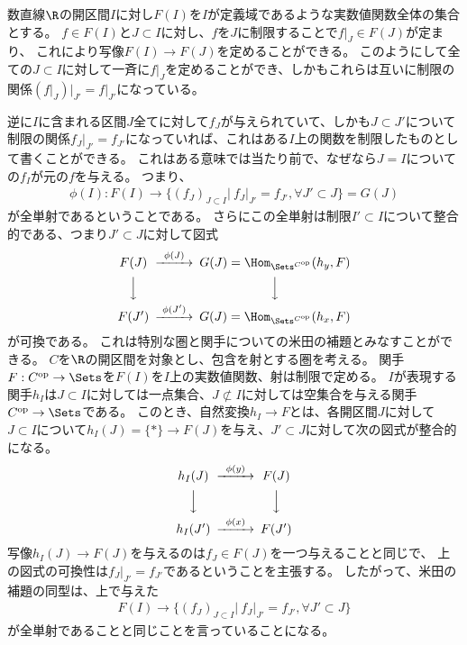 \documentclass[uplatex]{jsarticle}
\begin{document}
\begin{eg}
数直線$\R$の開区間$I$に対し$F(I)$を$I$が定義域であるような実数値関数全体の集合とする。
$f \in F(I)$と$J\subset I$に対し、$f$を$J$に制限することで$f\vert_J \in F(J)$が定まり、
これにより写像$F(I) \to F(J)$を定めることができる。
このようにして全ての$J \subset I$に対して一斉に$f\vert_J$を定めることができ、しかもこれらは互いに制限の関係$(f\vert_J)\vert_{J'}=f\vert_{J'}$になっている。

逆に$I$に含まれる区間$J$全てに対して$f_J$が与えられていて、しかも$J\subset J'$について制限の関係$f_J\vert_{J'}=f_{J'}$になっていれば、これはある$I$上の関数を制限したものとして書くことができる。
これはある意味では当たり前で、なぜなら$J=I$についての$f_I$が元の$f$を与える。
つまり、
\begin{align*}
\phi(I):F(I) \to \{(f_J)_{J\subset I}\vert~ f_J\vert_{J'} = f_{J'}, \forall J' \subset J\}=G(J)
\end{align*}
が全単射であるということである。
さらにこの全単射は制限$I'\subset I$について整合的である、つまり$J'\subset J$に対して図式
\[
\begin{CD}
F(J)@>\phi(J)>>G(J)=\Hom_{\Sets^{C^{\rm op}}}(h_y,F)\\
@VVV@VVV\\
F(J')@>\phi(J')>>G(J)=\Hom_{\Sets^{C^{\rm op}}}(h_x,F)
\end{CD}
\]
が可換である。
これは特別な圏と関手についての米田の補題とみなすことができる。
$C$を$\R$の開区間を対象とし、包含を射とする圏を考える。
関手$F:C^{\rm op} \to \Sets$を$F(I)$を$I$上の実数値関数、射は制限で定める。
$I$が表現する関手$h_I$は$J \subset I$に対しては一点集合、$J \not\subset I$に対しては空集合を与える関手$C^{\rm op} \to \Sets$である。
このとき、自然変換$h_I \to F$とは、各開区間$J$に対して$J \subset I$について$h_I(J)=\{*\} \to F(J)$を与え、$J'\subset J$に対して次の図式が整合的になる。
\[
\begin{CD}
h_I(J)@>\phi(y)>>F(J)\\
@VVV@VVV\\
h_I(J')@>\phi(x)>>F(J')
\end{CD}
\]
写像$h_I(J) \to F(J)$を与えるのは$f_J\in F(J)$を一つ与えることと同じで、
上の図式の可換性は$f_J\vert_{J'}=f_{J'}$であるということを主張する。
したがって、米田の補題の同型は、上で与えた
\begin{align*}
F(I) \to \{(f_J)_{J\subset I}\vert~ f_J\vert_{J'} = f_{J'}, \forall J' \subset J\}
\end{align*}
が全単射であることと同じことを言っていることになる。
\end{eg}
\end{document}
